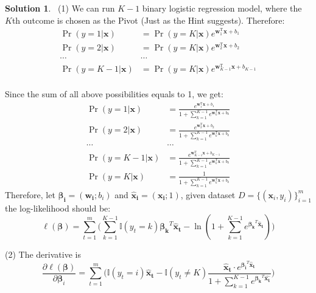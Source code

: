 \documentclass[a4paper,UTF8]{article}
\numberwithin{equation}{section}
\theoremstyle{definition}
\newtheorem*{solution}{Solution}
\begin{document}
\begin{solution} $\,$ \newline
(1) We can run $K-1$ binary logistic regression model, where the $K$th outcome is chosen as the Pivot (Just as the Hint suggests). Therefore:
 \begin{equation}
\begin{split}
\Pr(y=1| \mathbf{x}) &= {\Pr(y=K|\mathbf{x})}e^{ \mathbf{w}_1^\mathrm{T}\mathbf{x}+b_1} \\
\Pr(y=2| \mathbf{x}) &= {\Pr(y=K|\mathbf{x})}e^{ \mathbf{w}_2^\mathrm{T}\mathbf{x}+b_2} \\
\cdots & \cdots \\
\Pr(y=K-1| \mathbf{x}) &= {\Pr(y=K|\mathbf{x})}e^{\mathbf{w}_{K-1}^\mathrm{T}\mathbf{x}+b_{K-1}} \\
\end{split}
\end{equation}

Since the sum of all above possibilities equals to 1, we get:
 \begin{equation}
\begin{split}
\Pr(y=1 | \mathbf{x}) &= \frac{e^{ \mathbf{w}_1^\mathrm{T}\mathbf{x}+b_1}}{1 + \sum_{k=1}^{K-1} e^{\mathbf{w}_k^\mathrm{T}\mathbf{x}+b_k }} \\
\Pr(y=2 | \mathbf{x}) &= \frac{e^{\mathbf{w}_2^\mathrm{T}\mathbf{x}+b_2}}{1 + \sum_{k=1}^{K-1} e^{\mathbf{w}_k^\mathrm{T}\mathbf{x}+b_k }} \\
\cdots & \cdots \\
\Pr(y=K-1|\mathbf{x}) &= \frac{e^{\mathbf{w}_{K-1}^\mathrm{T}\mathbf{x}+b_{K-1}}}{1 + \sum_{k=1}^{K-1} e^{\mathbf{w}_k^\mathrm{T}\mathbf{x}+b_k }} \\
\Pr(y=K|\mathbf{x}) &= \frac{1}{1 + \sum_{k=1}^{K-1} e^{\mathbf{w}_k^\mathrm{T}\mathbf{x}+b_k }} 
\end{split}
\end{equation}
Therefore, let $\mathbf{\boldsymbol\beta_i} = (\mathbf{w_i};b_i)$ and $\mathbf{\hat{x}_i} = (\mathbf{x_i}; 1)$, given dataset $D  = \{(\mathbf{x}_i, y_i) \}_{i=1}^{m}$ the log-likelihood should be:
 \begin{equation}
 \ell(\mathbf{\boldsymbol\beta}) = \sum_{t=1}^{m} \big( \sum_{k=1}^{K-1} \mathbb{I}(y_t = k) \mathbf{\boldsymbol\beta_k}^T\mathbf{\hat{x}_t} - \ln(1 + \sum_{k=1}^{K-1} e^{\mathbf{\boldsymbol\beta_k}^T\mathbf{\hat{x}_t }}) 		\big)
 \end{equation}

(2) The derivative is 
\begin{equation}
\frac{\partial \ell(\boldsymbol\beta)} {\partial \boldsymbol\beta_i }  = \sum_{t=1}^{m} \big(  \mathbb{I}(y_t = i)\mathbf{\hat{x}_t} 
- \mathbb{I}(y_t \neq K)  \frac 
{\mathbf{\hat{x}_t } \cdot e^{\mathbf{\boldsymbol\beta_i}^T\mathbf{\hat{x}_t }} 	}
{1 + \sum_{k=1}^{K-1} e^{\mathbf{\boldsymbol\beta_k}^T\mathbf{\hat{x_t} }}}
\big)
\end{equation}
~\\
~\\
~\\
~\\
~\\
\end{solution}
\end{document}
